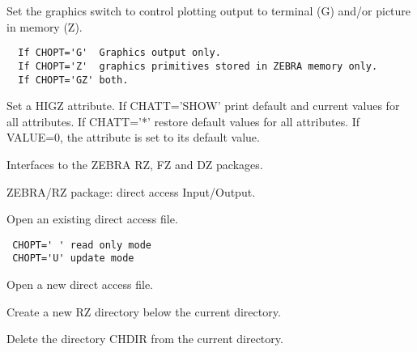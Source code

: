 \BEGARG
{}
\ENDARG
\BEGTEXT
Set the graphics switch to control plotting output
to terminal (G) and/or picture in memory (Z).
\begin{verbatim}
  If CHOPT='G'  Graphics output only.
  If CHOPT='Z'  graphics primitives stored in ZEBRA memory only.
  If CHOPT='GZ' both.
\end{verbatim}
\ENDTEXT

\BEGARG
{}
\ENDARG
\BEGTEXT
Set a HIGZ attribute.
If CHATT='SHOW' print default and current values for all attributes.
If CHATT='*' restore default values for all attributes.
If VALUE=0, the attribute is set to its default value.
\ENDTEXT


\BEGTEXT
Interfaces to the ZEBRA RZ, FZ and DZ packages.
\ENDTEXT


\BEGTEXT
ZEBRA/RZ package: direct access Input/Output.
\ENDTEXT

\BEGARG
{}
\ENDARG
\BEGTEXT
Open an existing direct access file.
\begin{verbatim}
 CHOPT=' ' read only mode
 CHOPT='U' update mode
\end{verbatim}
\ENDTEXT

\BEGARG
{}
\ENDARG
\BEGTEXT
Open a new direct access file.
\ENDTEXT

\BEGARG
{}
\ENDARG
\BEGTEXT
Create a new RZ directory below the current directory.
\ENDTEXT

\BEGARG
{}
\ENDARG
\BEGTEXT
Delete the directory CHDIR from the current directory.
\ENDTEXT

